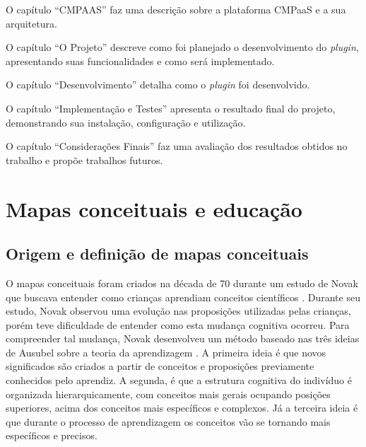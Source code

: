 \documentclass[
	12pt,				%
	openright,			%
	oneside,			%
	a4paper,			%
	english,			%
	french,				%
	spanish,			%
	brazil				%
	]{abntex2}
\begin{document}
O capítulo ``CMPAAS'' faz uma descrição sobre a  plataforma CMPaaS e a sua arquitetura.

O capítulo ``O Projeto'' descreve como foi planejado o desenvolvimento do \textit{plugin}, apresentando suas funcionalidades e como será implementado.

O capítulo ``Desenvolvimento'' detalha como o \textit{plugin} foi desenvolvido.

O capítulo ``Implementação e Testes'' apresenta o resultado final do projeto, demonstrando sua instalação, configuração e utilização.

O capítulo ``Considerações Finais'' faz uma avaliação dos resultados obtidos no trabalho e propõe trabalhos futuros.





\chapter{Mapas conceituais e educação}\label{cap-maps}
\section{Origem e definição de mapas conceituais}
O mapas conceituais foram criados na década de 70 durante um estudo de Novak que buscava entender como crianças aprendiam conceitos científicos \cite{Novak2005}. Durante seu estudo, Novak observou uma evolução nas proposições utilizadas pelas crianças, porém teve dificuldade de entender como esta mudança cognitiva ocorreu. Para compreender tal mudança, Novak desenvolveu um método baseado nas três ideias de Ausubel sobre a teoria da aprendizagem \cite{ausubel1963}. A primeira ideia é que novos significados são criados a partir de conceitos e proposições previamente conhecidos pelo aprendiz. A segunda, é que a estrutura cognitiva do indivíduo é organizada hierarquicamente, com conceitos mais gerais ocupando posições superiores, acima dos conceitos mais específicos e complexos. Já a terceira ideia é que durante o processo de aprendizagem os conceitos vão se tornando mais específicos e precisos.
\end{document}
